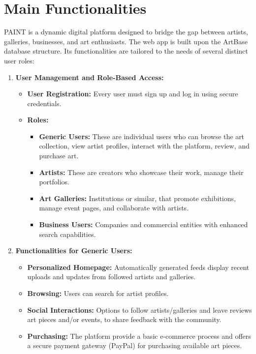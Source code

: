 \section{Main Functionalities}

PAINT is a dynamic digital platform designed to bridge the gap between artists, galleries, businesses, and art enthusiasts. 
The web app is built upon the ArtBase database structure. Its functionalities are tailored to the needs of several distinct user roles:

\begin{enumerate}
    \item \textbf{User Management and Role-Based Access:} 
    \begin{itemize}
        \item \textbf{User Registration:} Every user must sign up and log in using secure credentials.
        \item \textbf{Roles:}
        \begin{itemize}
            \item \textbf{Generic Users:} These are individual users who can browse the art collection, view artist profiles, interact with the platform, review, and purchase art.
            \item \textbf{Artists:} These are creators who showcase their work, manage their portfolios.
            \item \textbf{Art Galleries:} Institutions or similar, that promote exhibitions, manage event pages, and collaborate with artists.
            \item \textbf{Business Users:} Companies and commercial entities with enhanced search capabilities.
        \end{itemize}
    \end{itemize}

    \item \textbf{Functionalities for Generic Users:} 
    \begin{itemize}
        \item \textbf{Personalized Homepage:} Automatically generated feeds display recent uploads and updates from followed artists and galleries.
        \item \textbf{Browsing:} Users can search for artist profiles.
        \item \textbf{Social Interactions:} Options to follow artists/galleries and leave reviews art pieces and/or events, to share feedback with the community.
        \item \textbf{Purchasing:} The platform provide a basic e-commerce process and offers a secure payment gateway (PayPal) for purchasing available art pieces.
    \end{itemize}


\end{enumerate}
